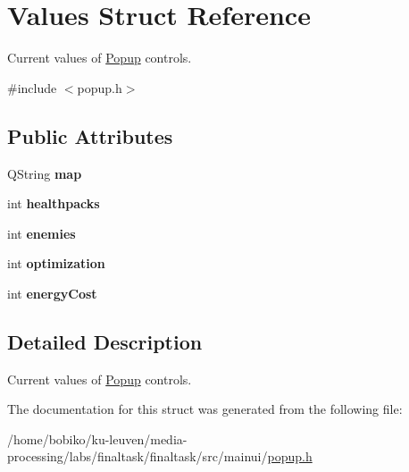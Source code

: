 \hypertarget{structValues}{}\section{Values Struct Reference}
\label{structValues}


Current values of \hyperlink{classPopup}{Popup} controls.  




{\ttfamily \#include $<$popup.\+h$>$}

\subsection*{Public Attributes}
\begin{DoxyCompactItemize}
\item 
Q\+String {\bfseries map}\hypertarget{structValues_a9599915bd0bd7b31ea73038ebcd2fc7f}{}\label{structValues_a9599915bd0bd7b31ea73038ebcd2fc7f}

\item 
int {\bfseries healthpacks}\hypertarget{structValues_ab3bb6a5ee626c6778831a30dfaf2fb72}{}\label{structValues_ab3bb6a5ee626c6778831a30dfaf2fb72}

\item 
int {\bfseries enemies}\hypertarget{structValues_a7a02de91e3e76a3e0e3a8be5d4c5bf75}{}\label{structValues_a7a02de91e3e76a3e0e3a8be5d4c5bf75}

\item 
int {\bfseries optimization}\hypertarget{structValues_a43becf75ca7a69cbdbb8cbfa7ef7bfea}{}\label{structValues_a43becf75ca7a69cbdbb8cbfa7ef7bfea}

\item 
int {\bfseries energy\+Cost}\hypertarget{structValues_a34c89d924a209bbda58b0a6070ee6d94}{}\label{structValues_a34c89d924a209bbda58b0a6070ee6d94}

\end{DoxyCompactItemize}


\subsection{Detailed Description}
Current values of \hyperlink{classPopup}{Popup} controls. 

The documentation for this struct was generated from the following file\+:\begin{DoxyCompactItemize}
\item 
/home/bobiko/ku-\/leuven/media-\/processing/labs/finaltask/finaltask/src/mainui/\hyperlink{popup_8h}{popup.\+h}\end{DoxyCompactItemize}
